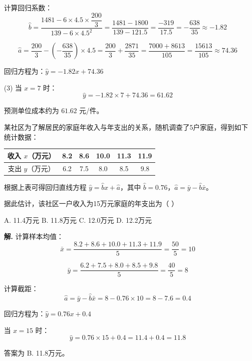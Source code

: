 \documentclass[11pt]{ctexrep}
\begin{document}
计算回归系数：
\[
\hat{b} = \frac{1481 - 6 \times 4.5 \times \dfrac{200}{3}}{139 - 6 \times 4.5^2} = \frac{1481 - 1800}{139 - 121.5} = \frac{-319}{17.5} = -\frac{638}{35} \approx -1.82
\]

\[
\hat{a} = \frac{200}{3} - \left(-\frac{638}{35}\right) \times 4.5 = \frac{200}{3} + \frac{2871}{35} = \frac{7000 + 8613}{105} = \frac{15613}{105} \approx 74.36
\]

回归方程为：$\hat{y} = -1.82x + 74.36$

(3) 当 $x = 7$ 时：
\[
\hat{y} = -1.82 \times 7 + 74.36 = 61.62
\]

预测单位成本约为 $61.62$ 元/件。

\begin{example}[回归分析的实际应用]
    某社区为了解居民的家庭年收入与年支出的关系，随机调查了5户家庭，得到如下统计数据：

    \begin{center}
    \begin{tabular}{c|ccccc}
    \hline
    收入 $x$（万元） & 8.2 & 8.6 & 10.0 & 11.3 & 11.9 \\
    \hline
    支出 $y$（万元） & 6.2 & 7.5 & 8.0 & 8.5 & 9.8 \\
    \hline
    \end{tabular}
    \end{center}

    根据上表可得回归直线方程 $\hat{y} = \hat{b}x + \hat{a}$，其中 $\hat{b} = 0.76$，$\hat{a} = \bar{y} - \hat{b}\bar{x}$。

    据此估计，该社区一户收入为15万元家庭的年支出为（  ）

    A. 11.4万元 \quad B. 11.8万元 \quad C. 12.0万元 \quad D. 12.2万元
\end{example}

\textbf{解.} 计算样本均值：
\[
\bar{x} = \frac{8.2 + 8.6 + 10.0 + 11.3 + 11.9}{5} = \frac{50}{5} = 10
\]

\[
\bar{y} = \frac{6.2 + 7.5 + 8.0 + 8.5 + 9.8}{5} = \frac{40}{5} = 8
\]

计算截距：
\[
\hat{a} = \bar{y} - \hat{b}\bar{x} = 8 - 0.76 \times 10 = 8 - 7.6 = 0.4
\]

回归方程为：$\hat{y} = 0.76x + 0.4$

当 $x = 15$ 时：
\[
\hat{y} = 0.76 \times 15 + 0.4 = 11.4 + 0.4 = 11.8
\]

答案为 B. 11.8万元。
\end{document}
